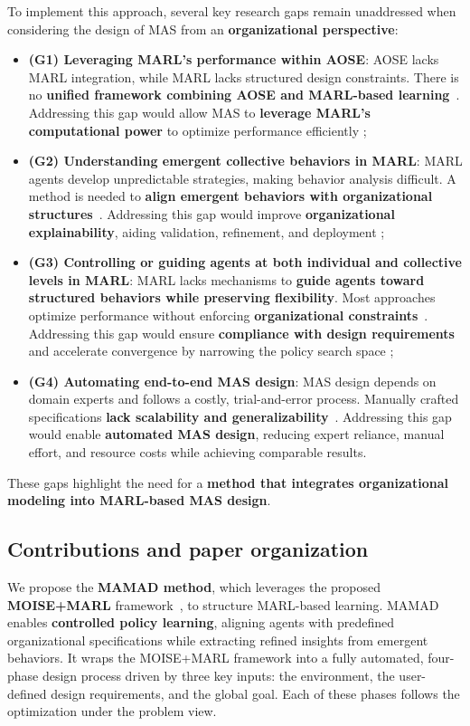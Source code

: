 \documentclass[pdflatex,sn-mathphys-num]{sn-jnl}%
\theoremstyle{thmstyleone}%
\theoremstyle{thmstyletwo}%
\theoremstyle{thmstylethree}%
\begin{document}
To implement this approach, several key research gaps remain unaddressed when considering the design of MAS from an \textbf{organizational perspective}:
%
\begin{itemize}
  \item \textbf{(G1) Leveraging MARL's performance within AOSE}: AOSE lacks MARL integration, while MARL lacks structured design constraints. There is no \textbf{unified framework combining AOSE and MARL-based learning}~\cite{Cossentino2014}. Addressing this gap would allow MAS to \textbf{leverage MARL's computational power} to optimize performance efficiently ;
  
  \item \textbf{(G2) Understanding emergent collective behaviors in MARL}: MARL agents develop unpredictable strategies, making behavior analysis difficult. A method is needed to \textbf{align emergent behaviors with organizational structures}~\cite{Du2022, Papoudakis2021}. Addressing this gap would improve \textbf{organizational explainability}, aiding validation, refinement, and deployment ;
  
  \item \textbf{(G3) Controlling or guiding agents at both individual and collective levels in MARL}: MARL lacks mechanisms to \textbf{guide agents toward structured behaviors while preserving flexibility}. Most approaches optimize performance without enforcing \textbf{organizational constraints}~\cite{Oroojlooy2023}. Addressing this gap would ensure \textbf{compliance with design requirements} and accelerate convergence by narrowing the policy search space ;
  
  \item \textbf{(G4) Automating end-to-end MAS design}: MAS design depends on domain experts and follows a costly, trial-and-error process. Manually crafted specifications \textbf{lack scalability and generalizability}~\cite{Nguyen2020}. Addressing this gap would enable \textbf{automated MAS design}, reducing expert reliance, manual effort, and resource costs while achieving comparable results.
\end{itemize}
%
These gaps highlight the need for a \textbf{method that integrates organizational modeling into MARL-based MAS design}.


\subsection{Contributions and paper organization}

We propose the \textbf{MAMAD method}, which leverages the proposed \textbf{MOISE+MARL} framework~\cite{soule2025moisemarl}, to structure MARL-based learning. MAMAD enables \textbf{controlled policy learning}, aligning agents with predefined organizational specifications while extracting refined insights from emergent behaviors. It wraps the MOISE+MARL framework into a fully automated, four-phase design process driven by three key inputs: the environment, the user-defined design requirements, and the global goal. Each of these phases follows the optimization under the problem view.
\end{document}
